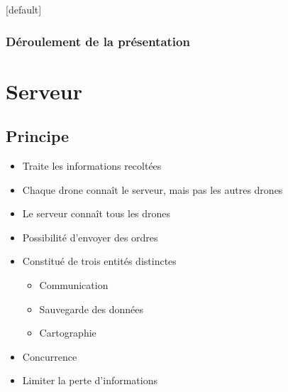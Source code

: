 \documentclass{beamer}
\begin{document}
  {
    \makeatletter
    [default]
    \def\beamer@entrycode{\vspace*{-\headheight}}
    \makeatother
    \begin{frame}
      \frametitle{Déroulement de la présentation}
      \tableofcontents[hidesubsections]
    \end{frame}
  }
  
  {
    \section{Serveur}
    
      \begin{frame}
	\tableofcontents[hideothersubsections]
      \end{frame}
     
      \subsection{Principe}
	\begin{frame}
	  \begin{itemize}
	   \item Traite les informations recoltées
	   \item Chaque drone connaît le serveur, mais pas les autres drones
	   \item Le serveur connaît tous les drones
	   \item Possibilité d'envoyer des ordres
	  \end{itemize}
	\end{frame}
      
	\begin{frame}
	  \begin{itemize}
	    \item Constitué de trois entités distinctes
	    \begin{itemize}
	      \item Communication
	      \item Sauvegarde des données
	      \item Cartographie
	    \end{itemize}
	    \item Concurrence
	    \item Limiter la perte d'informations
	  \end{itemize}
	\end{frame}
	
}
\end{document}

